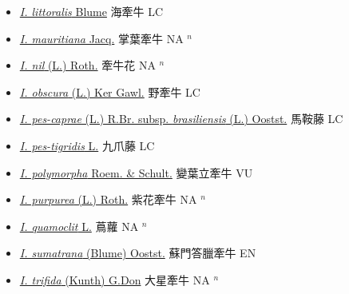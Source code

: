 \begin{itemize}
\begin{itemize}
        \item[] \href{http://www.theplantlist.org/tpl1.1/search?q=Ipomoea+littoralis}{\textit{I. littoralis} Blume}   海牽牛 LC
        \item[] \href{http://www.theplantlist.org/tpl1.1/search?q=Ipomoea+mauritiana}{\textit{I. mauritiana} Jacq.}   掌葉牽牛 NA $^n$
        \item[] \href{http://www.theplantlist.org/tpl1.1/search?q=Ipomoea+nil}{\textit{I. nil} (L.) Roth.}   牽牛花 NA $^n$
        \item[] \href{http://www.theplantlist.org/tpl1.1/search?q=Ipomoea+obscura}{\textit{I. obscura} (L.) Ker Gawl.}   野牽牛 LC
        \item[] \href{http://www.theplantlist.org/tpl1.1/search?q=Ipomoea+pes-caprae+subsp.+brasiliensis}{\textit{I. pes-caprae} (L.) R.Br. subsp. \textit{brasiliensis} (L.) Oostst.}   馬鞍藤 LC
        \item[] \href{http://www.theplantlist.org/tpl1.1/search?q=Ipomoea+pes-tigridis}{\textit{I. pes-tigridis} L.}   九爪藤 LC
        \item[] \href{http://www.theplantlist.org/tpl1.1/search?q=Ipomoea+polymorpha}{\textit{I. polymorpha} Roem. \& Schult.}   變葉立牽牛 VU
        \item[] \href{http://www.theplantlist.org/tpl1.1/search?q=Ipomoea+purpurea}{\textit{I. purpurea} (L.) Roth.}   紫花牽牛 NA $^n$
        \item[] \href{http://www.theplantlist.org/tpl1.1/search?q=Ipomoea+quamoclit}{\textit{I. quamoclit} L.}   蔦蘿 NA $^n$
        \item[] \href{http://www.theplantlist.org/tpl1.1/search?q=Ipomoea+sumatrana}{\textit{I. sumatrana} (Blume) Oostst.}   蘇門答臘牽牛 EN
        \item[] \href{http://www.theplantlist.org/tpl1.1/search?q=Ipomoea+trifida}{\textit{I. trifida} (Kunth) G.Don}   大星牽牛 NA $^n$

\end{itemize}
\end{itemize}
